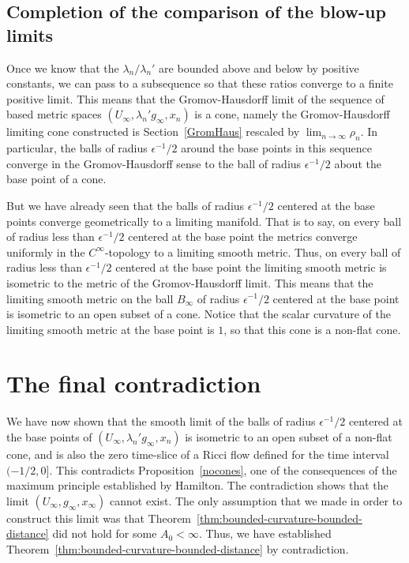 \subsection{Completion of the comparison of the blow-up limits}

Once we know that the $\lambda_n/\lambda_n'$ are bounded above and
below by positive constants, we can pass to a subsequence so that
these ratios converge to a finite positive limit. This means that
the Gromov-Hausdorff limit of the sequence of based metric spaces
$(U_\infty,\lambda_n'g_\infty,x_n)$ is a  cone, namely the
Gromov-Hausdorff limiting cone constructed is Section~\ref{GromHaus}
rescaled by $\lim_{n\rightarrow\infty}\rho_n$. In particular,
the balls of radius $\epsilon^{-1}/2$ around the base points in this
sequence converge in the Gromov-Hausdorff sense to the ball of
radius $\epsilon^{-1}/2$ about the base point of a cone.


But we have already seen that the balls of radius $\epsilon^{-1}/2$
centered at the base points converge geometrically to a limiting
manifold. That is to say, on every   ball of radius less than
$\epsilon^{-1}/2$ centered at the base point the metrics converge
uniformly in the $C^\infty$-topology to a limiting smooth metric.
Thus, on every ball of radius less than $\epsilon^{-1}/2$ centered
at the base point the limiting smooth metric is isometric to the
metric of the Gromov-Hausdorff limit. This means that the limiting
smooth metric on the ball $B_\infty$ of radius $\epsilon^{-1}/2$
centered at the base point is isometric to an open subset of a cone.
Notice that the scalar curvature of the limiting smooth metric at
the base point is $1$, so that this cone is a non-flat cone.




\section{The final contradiction}

We have now shown that the smooth limit of the balls of radius
$\epsilon^{-1}/2$ centered at the base points of
$(U_\infty,\lambda_n'g_\infty,x_n)$ is isometric to an open subset
of a non-flat cone, and is also the zero time-slice of a
Ricci flow defined for the time interval $(-1/2,0]$. This
contradicts Proposition~\ref{nocones},  one of the consequences of
the maximum principle established by Hamilton. The contradiction
shows that the limit $(U_\infty,g_\infty,x_\infty)$ cannot exist.
The only assumption that we made in order to construct this limit
was that Theorem~\ref{thm:bounded-curvature-bounded-distance} did not hold for some $A_0<\infty$.
Thus, we have established Theorem~\ref{thm:bounded-curvature-bounded-distance}  by contradiction.

